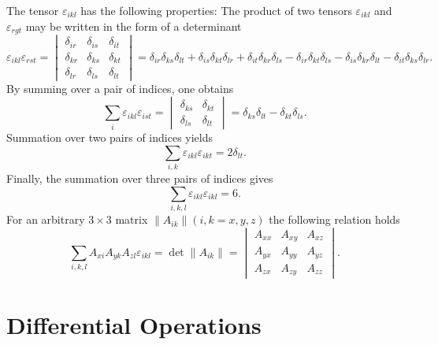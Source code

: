 The tensor \(\varepsilon_{i k l}\) has the following properties: The product of two tensors \(\varepsilon_{i k l}\) and \(\varepsilon_{r g t}\) may be written in the form of a determinant
\begin{equation}
\varepsilon_{i k l} \varepsilon_{r s t}=\begin{vmatrix}
\delta_{i r} & \delta_{i s} & \delta_{i t}  \\
\delta_{k r} & \delta_{k s} & \delta_{k t} \\
\delta_{l r} & \delta_{l s} & \delta_{l t}
\end{vmatrix}=\delta_{i r} \delta_{k s} \delta_{l t}+\delta_{i s} \delta_{k t} \delta_{l r}+\delta_{i t} \delta_{k r} \delta_{l s}-\delta_{i r} \delta_{k t} \delta_{l s}-\delta_{i s} \delta_{k r} \delta_{l t}-\delta_{i t} \delta_{k s} \delta_{l r}. \label{eq:1:2:36}
\end{equation}
By summing over a pair of indices, one obtains
\begin{equation}
\sum_{i} \varepsilon_{i k l} \varepsilon_{i s t}=\begin{vmatrix}
\delta_{k s} & \delta_{k t}  \\
\delta_{l s} & \delta_{l t}
\end{vmatrix}=\delta_{k s} \delta_{l t}-\delta_{k t} \delta_{l s}. \label{eq:1:2:37}
\end{equation}
Summation over two pairs of indices yields
\begin{equation}
\sum_{i, k} \varepsilon_{i k l} \varepsilon_{i k t}=2 \delta_{l t} . \label{eq:1:2:38}
\end{equation}
Finally, the summation over three pairs of indices gives
\begin{equation}
\sum_{i, k, l} \varepsilon_{i k l} \varepsilon_{i k l}=6 . \label{eq:1:2:39}
\end{equation}
For an arbitrary \(3 \times 3\) matrix \(\left\|A_{i k}\right\|(i, k=x, y, z)\) the following relation holds
\begin{equation}
\sum_{i, k, l} A_{x i} A_{y k} A_{z l} \varepsilon_{i k l}=\det\left\|A_{i k}\right\|=\begin{vmatrix}
A_{x x} & A_{x y} & A_{x z}  \label{eq:1:2:40}\\
A_{y x} & A_{y y} & A_{y z} \\
A_{z x} & A_{z y} & A_{z z}
\end{vmatrix} .
\end{equation}
\section{Differential Operations}\label{sec:1.3}
